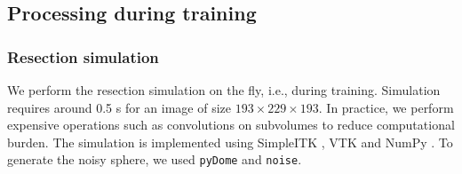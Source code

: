 \subsection{Processing during training}

\subsubsection{Resection simulation}

We perform the resection simulation on the fly, i.e., during training.
Simulation requires around 0.5 s for an image of size $193 \times 229 \times 193$.
In practice, we perform expensive operations such as convolutions on subvolumes to reduce computational burden.
The simulation is implemented using SimpleITK \cite{lowekamp_design_2013}, VTK \cite{schroeder_visualization_2006} and NumPy \cite{van_der_walt_numpy_2011}.
To generate the noisy sphere, we used \texttt{pyDome} and \texttt{noise}.


